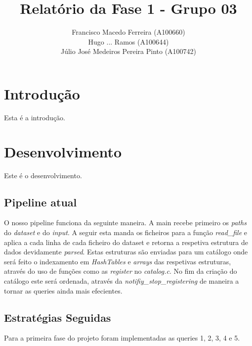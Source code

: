 \documentclass{article}
\title{Relatório da Fase 1 - Grupo 03}
\author{Francisco Macedo Ferreira (A100660)\\Hugo ... Ramos (A100644)\\Júlio José Medeiros Pereira Pinto (A100742)}
\begin{document}
    \maketitle

    \section{Introdução}

    Esta é a introdução.

    \section{Desenvolvimento}

        Este é o desenvolvimento.

        \subsection{Pipeline atual}
            O nosso pipeline funciona da seguinte maneira.
            A main recebe primeiro os \emph{paths} do \emph{dataset} e do \emph{input}.
            A seguir esta manda os ficheiros para a função \emph{read_file} e aplica a
            cada linha de cada ficheiro do dataset e retorna a respetiva estrutura de 
            dados devidamente \emph{parsed}.
            Estas estruturas são enviadas para um catálogo onde será feito o indexamento
            em \emph{HashTables} e \emph{arrays} das respetivas estruturas, através do
            uso de funções como as \emph{register} no \emph{catalog.c}. No fim da criação
            do catálogo este será ordenada, através da \emph{notifiy_stop_registering}
            de maneira a tornar as queries ainda mais efecientes.
            
        \subsection{Estratégias Seguidas}

        Para a primeira fase do projeto foram implementadas as queries 1, 2, 3, 4 e 5.
\end{document}
